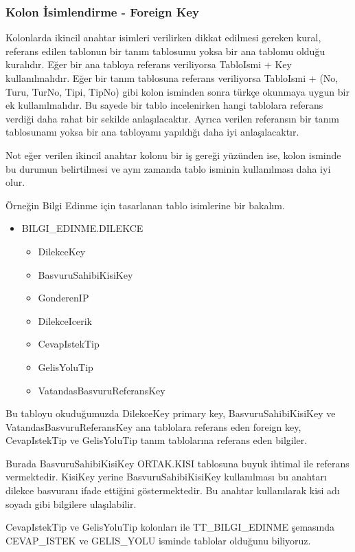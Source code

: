 \documentclass[10pt,a4paper,draft]{article}
\begin{document}
\subsubsection{Kolon İsimlendirme - Foreign Key}

Kolonlarda ikincil anahtar isimleri verilirken dikkat edilmesi gereken kural,
referans edilen tablonun bir tanım tablosumu yoksa bir ana tablomu olduğu kuralıdır.
Eğer bir ana tabloya referans veriliyorsa TabloIsmi + Key kullanılmalıdır.
Eğer bir tanım tablosuna referans veriliyorsa TabloIsmi + (No, Turu, TurNo, Tipi, TipNo)
gibi kolon isminden sonra türkçe okunmaya uygun bir ek kullanılmalıdır.
Bu sayede bir tablo incelenirken hangi tablolara referans verdiği daha rahat bir
sekilde anlaşılacaktır. 
Ayrıca verilen referansın bir tanım tablosunamı yoksa bir ana tabloyamı yapıldığı
daha iyi anlaşılacaktır.

Not eğer verilen ikincil anahtar kolonu bir iş gereği yüzünden ise,
kolon isminde bu durumun belirtilmesi ve aynı zamanda tablo isminin kullanılması daha iyi 
olur.

Örneğin Bilgi Edinme için tasarlanan tablo isimlerine bir bakalım.
\begin{itemize}

\item BILGI\_EDINME.DILEKCE
	\begin{itemize}
		\item DilekceKey
		\item BasvuruSahibiKisiKey
		\item GonderenIP
		\item DilekceIcerik
		\item CevapIstekTip
		\item GelisYoluTip
		\item VatandasBasvuruReferansKey
	\end{itemize}

\end{itemize}

Bu tabloyu okuduğumuzda DilekceKey primary key, 
BasvuruSahibiKisiKey ve VatandasBasvuruReferansKey ana tablolara referans eden foreign key,
CevapIstekTip ve GelisYoluTip tanım tablolarına referans eden bilgiler.

Burada BasvuruSahibiKisiKey ORTAK.KISI tablosuna buyuk ihtimal ile referans vermektedir.
KisiKey yerine BasvuruSahibiKisiKey kullanılması bu anahtarı dilekce basvuranı ifade ettiğini
göstermektedir. Bu anahtar kullanılarak kisi adı soyadı gibi bilgilere ulaşılabilir.

CevapIstekTip ve GelisYoluTip kolonları ile TT\_BILGI\_EDINME şemasında
CEVAP\_ISTEK ve GELIS\_YOLU isminde tablolar olduğunu biliyoruz.
\end{document}

